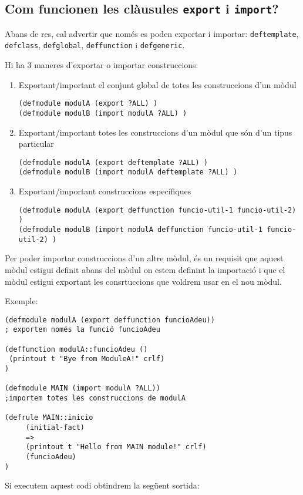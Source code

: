 \documentclass[11pt,svgnames]{scrbook}
\begin{document}
\subsection{Com funcionen les clàusules \texttt{export} i \texttt{import}?}


Abans de res, cal advertir que només es poden exportar i importar: \texttt{deftemplate}, \texttt{defclass}, \texttt{defglobal}, \texttt{deffunction} i \texttt{defgeneric}.

Hi ha 3 maneres d'exportar o importar construccions:
\begin{enumerate}
 \item Exportant/important el conjunt global de totes les construccions d'un mòdul

\begin{verbatim}
(defmodule modulA (export ?ALL) )
(defmodule modulB (import modulA ?ALL) )
\end{verbatim}
\item Exportant/important totes les construccions d'un mòdul que són d'un tipus particular

\begin{verbatim}
(defmodule modulA (export deftemplate ?ALL) )
(defmodule modulB (import modulA deftemplate ?ALL) )
\end{verbatim}
\item Exportant/important construccions específiques

\begin{verbatim}
(defmodule modulA (export deffunction funcio-util-1 funcio-util-2) )
(defmodule modulB (import modulA deffunction funcio-util-1 funcio-util-2) )
\end{verbatim}
\end{enumerate}


Per poder importar construccions d'un altre mòdul, és un requisit que aquest mòdul estigui definit abans del mòdul on estem definint la importació i que el mòdul estigui exportant les consrtuccions que voldrem usar en el nou mòdul.

Exemple:

\begin{verbatim}
(defmodule modulA (export deffunction funcioAdeu)) 
; exportem només la funció funcioAdeu

(deffunction modulA::funcioAdeu ()
 (printout t "Bye from ModuleA!" crlf)
)

(defmodule MAIN (import modulA ?ALL)) 
;importem totes les construccions de modulA

(defrule MAIN::inicio
     (initial-fact)
     =>
     (printout t "Hello from MAIN module!" crlf)
     (funcioAdeu)
)
\end{verbatim}
Si executem aquest codi obtindrem la següent sortida:
\end{document}
